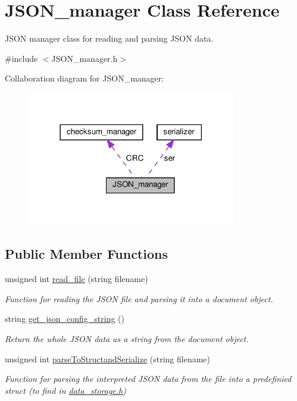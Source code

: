 \hypertarget{classJSON__manager}{}\section{J\+S\+O\+N\+\_\+manager Class Reference}
\label{classJSON__manager}


J\+S\+ON manager class for reading and parsing J\+S\+ON data.  




{\ttfamily \#include $<$J\+S\+O\+N\+\_\+manager.\+h$>$}



Collaboration diagram for J\+S\+O\+N\+\_\+manager\+:
\nopagebreak
\begin{figure}[H]
\begin{center}
\leavevmode
\includegraphics[width=258pt]{classJSON__manager__coll__graph}
\end{center}
\end{figure}
\subsection*{Public Member Functions}
\begin{DoxyCompactItemize}
\item 
unsigned int \hyperlink{classJSON__manager_a9b600a34d73fd3f28bf00ddf3f2e6640}{read\+\_\+file} (string filename)
\begin{DoxyCompactList}\small\item\em Function for reading the J\+S\+ON file and parsing it into a document object. \end{DoxyCompactList}\item 
string \hyperlink{classJSON__manager_a5d05e5f8eb6883f38181d48cf26cc5fc}{get\+\_\+json\+\_\+config\+\_\+string} ()
\begin{DoxyCompactList}\small\item\em Return the whole J\+S\+ON data as a string from the document object. \end{DoxyCompactList}\item 
unsigned int \hyperlink{classJSON__manager_a7bb6db218d195494ca939233671cb183}{parse\+To\+Structand\+Serialize} (string filename)
\begin{DoxyCompactList}\small\item\em Function for parsing the interpreted J\+S\+ON data from the file into a predefinied struct (to find in \hyperlink{data__storage_8h}{data\+\_\+storage.\+h}) \end{DoxyCompactList}\end{DoxyCompactItemize}
